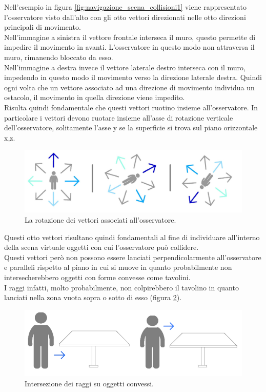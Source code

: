 Nell’esempio in figura \ref{fig:navigazione_scena_collisioni1}  viene rappresentato l’osservatore visto dall’alto con gli otto vettori direzionati nelle otto direzioni principali di movimento.
\\
Nell’immagine a sinistra il vettore frontale interseca il muro, questo permette di impedire il movimento in avanti. L’osservatore in questo modo non attraversa il muro, rimanendo bloccato da esso.
\\
Nell’immagine a destra invece il vettore laterale destro interseca con il muro, impedendo in questo modo il movimento verso la direzione laterale destra.
Quindi ogni volta che un vettore associato ad una direzione di movimento individua un ostacolo, il movimento in quella direzione viene impedito.
\\
Risulta quindi fondamentale che questi vettori ruotino insieme all’osservatore. In particolare i vettori devono ruotare insieme all’asse di rotazione verticale dell’osservatore, solitamente l’asse y se la superficie si trova sul piano orizzontale x,z.
\begin{figure}[htb]
 \centering
 \includegraphics[width=1\linewidth]{images/chapter_navigazione_scena/coll_rotat.jpg}\hfill
 \caption[Veduta dall'alto dei vettori dell'osservatore.]{La rotazione dei vettori associati all'osservatore.}
 \label{fig:navigazione_scena_coll_rotat}
\end{figure}
Questi otto vettori risultano quindi fondamentali al fine di individuare all’interno della scena virtuale oggetti con cui l’osservatore può collidere.
\\
Questi vettori però non possono essere lanciati perpendicolarmente all’osservatore e paralleli rispetto al piano in cui si muove in quanto probabilmente non intersecherebbero oggetti con forme convesse come tavolini.
\\
I raggi infatti, molto probabilmente, non colpirebbero il tavolino in quanto lanciati nella zona vuota sopra o sotto di esso (figura \ref{fig:navigazione_scena_collision_tav1}).
\begin{figure}[htb]
 \centering
 \includegraphics[width=1\linewidth]{images/chapter_navigazione_scena/collision_tav1.png}\hfill
 \caption[Raggi su oggetti convessi.]{Intersezione dei raggi su oggetti convessi.}
 \label{fig:navigazione_scena_collision_tav1}
\end{figure}


